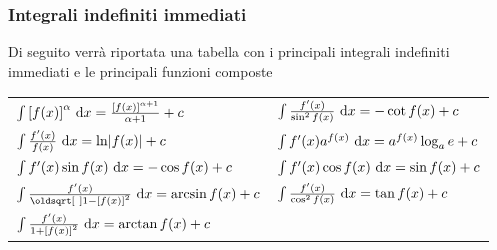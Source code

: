 \subsubsection{Integrali indefiniti immediati}
Di seguito verrà riportata una tabella con i principali integrali indefiniti immediati e le 
principali funzioni composte
\tablefirsthead{\midrule}
\tablehead{\midrule}
\tablelasttail{\bottomrule}
\renewcommand*{\arraystretch}{3.3}
\begin{center}
  \begin{xtabular}{M{4cm}|M{4cm}}
    $\int {[f(x)]}^\alpha\,\mathop{}\!\mathrm{d} x = \frac{{[f(x)]}^{\alpha+1}}{\alpha+1}+c$ & 
    $\int\frac{f'(x)}{\sin^2 f(x)}\,\mathop{}\!\mathrm{d} x = -\cot f(x) +c$\\ 
    $\int \frac{f'(x)}{f(x)}\,\mathop{}\!\mathrm{d} x = \ln\lvert f(x)\rvert+c$ &
    $\int f'(x)a^{f(x)}\,\mathop{}\!\mathrm{d} x = a^{f(x)}\log_a e + c$\\ 
    $\int f'(x)\sin f(x)\,\mathop{}\!\mathrm{d} x = -\cos f(x)+c$ &
    $\int f'(x)\cos f(x)\,\mathop{}\!\mathrm{d} x = \sin f(x) + c$\\ 
    $\int \frac{f'(x)}{\sqrt{1-{[f(x)]}^2}}\,\dif x = \arcsin f(x) + c$ &
    $\int \frac{f'(x)}{\cos^2 f(x)}\,\mathop{}\!\mathrm{d} x = \tan f(x) + c$\\ 
    $\int \frac{f'(x)}{1+{[f(x)]}^2}\,\mathop{}\!\mathrm{d} x = \arctan f(x) + c$ & \\ 
  \end{xtabular}
\end{center}
\renewcommand*{\arraystretch}{2.4}

